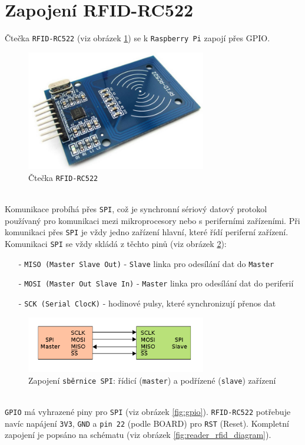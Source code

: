 \documentclass[czech,BP]{thesiskiv}
\begin{document}
				
		\section{Zapojení RFID-RC522}
Čtečka \texttt{RFID-RC522} (viz obrázek \ref{fig:rfid_rc522}) se k \texttt{Raspberry Pi} zapojí přes GPIO. 
\begin{figure}[H]
		\centering
		\includegraphics[width=0.7\textwidth]{../images/rfid_rc522.jpg}	
		\caption{Čtečka \texttt{RFID-RC522}}
		\label{fig:rfid_rc522}
	\end{figure}
\ \\
Komunikace probíhá přes \texttt{SPI}, což je synchronní sériový datový protokol používaný pro komunikaci mezi mikroprocesory nebo s periferními zařízeními.
Při komunikaci přes \texttt{SPI} je vždy jedno zařízení hlavní, které řídí periferní zařízení.
Komunikaci \texttt{SPI} se vždy skládá z těchto pinů (viz obrázek \ref{fig:spi}):			
\begin{itemize}[noitemsep]
\item [-] \texttt{MISO (Master Slave Out)} - \texttt{Slave} linka pro odesílání dat do \texttt{Master}
\item [-] \texttt{MOSI (Master Out Slave In)} - \texttt{Master} linka pro odesílání dat do periferií
\item [-] \texttt{SCK (Serial ClocK)} - hodinové pulsy, které synchronizují přenos dat 
\end{itemize}
						
	\begin{figure}[H]
		\centering
		\includegraphics[width=0.7\textwidth]{../images/spi.png}	
		\caption{Zapojení \texttt{sběrnice SPI}: řídicí (\texttt{master}) a podřízené (\texttt{slave}) zařízení}
		\label{fig:spi}
	\end{figure}
\ \\
\texttt{GPIO} má vyhrazené piny pro \texttt{SPI} (viz obrázek \ref{fig:gpio}). \texttt{RFID-RC522} potřebuje navíc napájení \texttt{3V3}, \texttt{GND} a \texttt{pin 22} (podle BOARD) pro \texttt{RST} (Reset). Kompletní zapojení je popsáno na schématu (viz obrázek \ref{fig:reader_rfid_diagram}).
\end{document}
